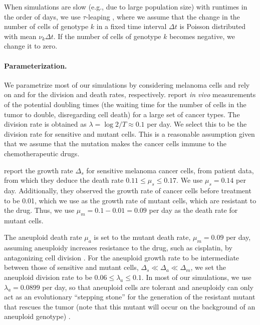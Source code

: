 \documentclass[12pt]{extarticle}
\begin{document}
When simulations are slow (e.g., due to large population size) with runtimes in the order of days, we use $\tau$-leaping \citep{gillespie2001approximate}, where we assume that the change in the number of cells of genotype $k$ in a fixed time interval $\Delta t$ is Poisson distributed with mean $\nu_k \Delta t$. If the number of cells of genotype $k$ becomes negative, we change it to zero. 


\paragraph{Parameterization.}
We parametrize most of our simulations by considering melanoma cells and rely on \citet{rew2000cell} and \citet{bozic2013evolutionary} for the division and death rates, respectively. 
\citet{rew2000cell} report \textit{in vivo} measurements of the potential doubling times (the waiting time for the number of cells in the tumor to double, disregarding cell death) for a large set of cancer types. The division rate is obtained as $\lambda=\log{2} / T \approx 0.1$ per day. We select this to be the division rate for sensitive and mutant cells. This is a reasonable assumption given that we assume that the mutation makes the cancer cells immune to the chemotherapeutic drugs. %

\citet{bozic2013evolutionary} report the growth rate $\Delta_s$ for sensitive melanoma cancer cells, from patient data, from which they deduce the death rate $0.11 \le \mu_s \le 0.17$. We use  $\mu_s=0.14$ per day. Additionally, they observed the growth rate of cancer cells before treatment to be 0.01, which we use as the growth rate of mutant cells, which are resistant to the drug. Thus, we use $\mu_m=0.1-0.01=0.09$ per day as the death rate for mutant cells. %

The aneuploid death rate $\mu_a$ is set to the mutant death rate, $\mu_m=0.09$ per day, assuming aneuploidy increases resistance to the drug, such as cisplatin, by antagonizing cell division \citep{replogle2020aneuploidy}.
For the aneuploid growth rate to be intermediate between those of sensitive and mutant cells, $\Delta_s\ll\Delta_a\ll\Delta_m$, we set the aneuploid division rate to be $0.06 \le \lambda_a \le 0.1$. %
In most of our simulations, we use $\lambda_a=0.0899$ per day, so that aneuploid cells are tolerant and aneuploidy can only act as an evolutionary ``stepping stone'' for the generation of the resistant mutant that rescues the tumor (note that this mutant will occur on the background of an aneuploid genotype) .  
\end{document}
